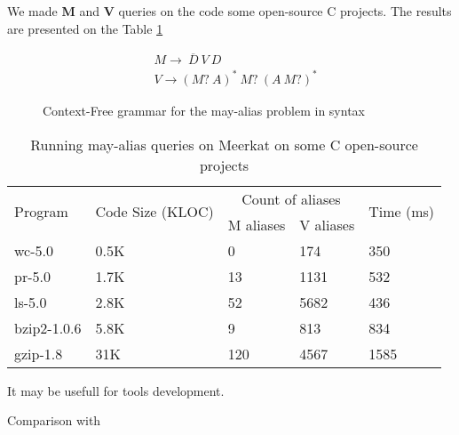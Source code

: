 We made \textbf{M} and \textbf{V} queries on the code some open-source C projects. The results are presented on the Table \ref{table:staticAnalysis} 

\begin{figure}[t]
\begin{align*}
& M \rightarrow\ \overline{D}\ V\ D\\
& V \rightarrow (M ?\ A)^{*} \ M?\ (A\ M?)^{*}
\end{align*}
\caption{Context-Free grammar for the may-alias problem in syntax}
\label{lst:aliasGrammar}
\end{figure}



\begin{table}[t]
\centering
\begin{tabular}{|l|l|ll|l|}
\hline
\multirow{2}{*}{Program} & \multirow{2}{*}{Code Size (KLOC)} & \multicolumn{2}{c|}{Count of aliases} & \multirow{2}{*}{Time (ms)} \\ \cline{3-4}
 &  & \multicolumn{1}{c|}{M aliases} & \multicolumn{1}{c|}{V aliases} &  \\ 
\hline
\hline
wc-5.0      & 0.5K & 0   & 174  & 350 \\
pr-5.0      & 1.7K & 13  & 1131 & 532 \\
ls-5.0      & 2.8K & 52  & 5682 & 436 \\
bzip2-1.0.6 & 5.8K & 9   & 813  & 834 \\
gzip-1.8    & 31K  & 120 & 4567 & 1585\\
\hline
\end{tabular}
\caption{Running may-alias queries on Meerkat on some C open-source projects}
\label{table:staticAnalysis}
\end{table}

It may be usefull for tools development.

Comparison with ~\cite{ScalaGraphParsing}